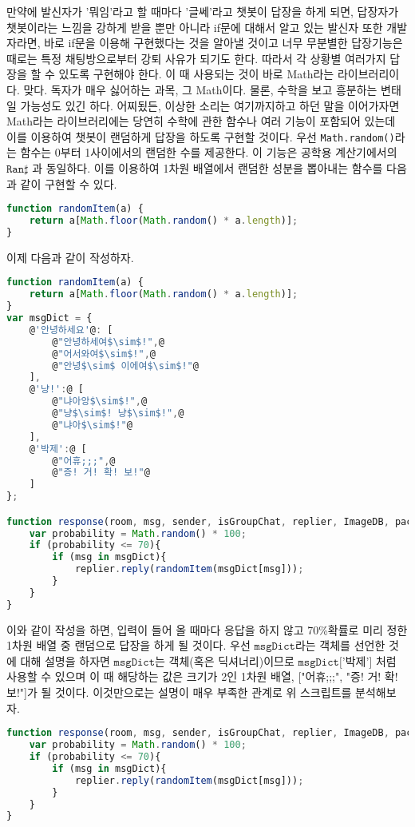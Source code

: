 \documentclass[10pt,b6paper,final]{book}
\begin{document}
만약에 발신자가 '뭐임'라고 할 때마다 '글쎄'라고 챗봇이 답장을 하게 되면, 답장자가 챗봇이라는
느낌을 강하게 받을 뿐만 아니라 if문에 대해서 알고 있는 발신자 또한 개발자라면, 바로 if문을
이용해 구현했다는 것을 알아낼 것이고 너무 무분별한 답장기능은 때로는 특정 채팅방으로부터 강퇴
사유가 되기도 한다. 따라서 각 상황별 여러가지 답장을 할 수 있도록 구현해야 한다. 이 때 사용되는
것이 바로 Math라는 라이브러리이다. 맞다. 독자가 매우 싫어하는 과목, 그 Math이다. 물론, 수학을
보고 흥분하는 변태일 가능성도 있긴 하다. 어찌됬든, 이상한 소리는 여기까지하고 하던 말을 이어가자면
Math라는 라이브러리에는 당연히 수학에 관한 함수나 여러 기능이 포함되어 있는데 이를 이용하여
챗봇이 랜덤하게 답장을 하도록 구현할 것이다.
우선 \texttt{Math.random()}라는 함수는 0부터 1사이에서의 랜덤한 수를 제공한다.
이 기능은 공학용 계산기에서의 $\texttt{Ran}\sharp$ 과 동일하다.
이를 이용하여 1차원 배열에서 랜덤한 성분을 뽑아내는 함수를 다음과 같이 구현할 수 있다.
\begin{lstlisting}[language=JavaScript,escapeinside=~~, caption={$\texttt{randomItem(array)}$}]
function randomItem(a) {
    return a[Math.floor(Math.random() * a.length)];
}
\end{lstlisting}
이제 다음과 같이 작성하자.
\begin{lstlisting}[language=JavaScript,escapeinside=@@, caption={RandomReply.js}]
function randomItem(a) {
    return a[Math.floor(Math.random() * a.length)];
}
var msgDict = {
    @'안녕하세요'@: [
        @"안녕하세여$\sim$!",@
        @"어서와여$\sim$!",@
        @"안녕$\sim$ 이에여$\sim$!"@
    ],
    @'냥!':@ [
        @"냐아앙$\sim$!",@
        @"냥$\sim$! 냥$\sim$!",@
        @"냐아$\sim$!"@
    ],
    @'박제':@ [
        @"어휴;;;",@
        @"증! 거! 확! 보!"@
    ]
};

function response(room, msg, sender, isGroupChat, replier, ImageDB, packageName, threadId){
    var probability = Math.random() * 100;
    if (probability <= 70){
        if (msg in msgDict){
            replier.reply(randomItem(msgDict[msg]));
        }
    }
}
\end{lstlisting}
이와 같이 작성을 하면, 입력이 들어 올 때마다 응답을 하지 않고 70\%확률로 미리 정한 1차원 배열 중 랜덤으로
답장을 하게 될 것이다. 우선 $\texttt{msgDict}$라는 객체를 선언한 것에 대해 설명을 하자면
$\texttt{msgDict}$는 객체(혹은 딕셔너리)이므로 $\texttt{msgDict['박제']}$ 처럼 사용할 수 있으며 이 때 해당하는 값은 크기가 2인 1차원 배열,
["어휴;;;", "증! 거! 확! 보!"]가 될 것이다. 이것만으로는 설명이 매우 부족한 관계로 위 스크립트를 분석해보자.
\begin{lstlisting}[language=JavaScript,escapeinside=@@]
function response(room, msg, sender, isGroupChat, replier, ImageDB, packageName, threadId){
    var probability = Math.random() * 100;
    if (probability <= 70){
        if (msg in msgDict){
            replier.reply(randomItem(msgDict[msg]));
        }
    }
}
\end{lstlisting}
\end{document}
